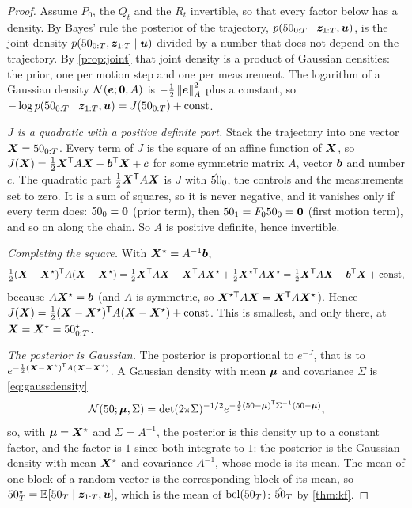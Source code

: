 \begin{proof}
Assume $P_0$, the $Q_t$ and the $R_t$ invertible, so that every factor
below has a density. By Bayes' rule the posterior of the trajectory,
$p(50_{0:T}\mid\bm{z}_{1:T},\bm{u})$, is the joint density
$p(50_{0:T},\bm{z}_{1:T}\mid\bm{u})$ divided by a number that does not depend on
the trajectory. By \cref{prop:joint} that joint density is a product of
Gaussian densities: the prior, one per motion step and one per
measurement. The logarithm of a Gaussian density
$\mathcal{N}(\bm{e};\bm{0},A)$ is $-\tfrac12\left\lVert \bm{e}\right\rVert_A^2$ plus a
constant, so $-\log p(50_{0:T}\mid\bm{z}_{1:T},\bm{u})=J(50_{0:T})
+\text{const}$.

\emph{$J$ is a quadratic with a positive definite part.} Stack the
trajectory into one vector $\bm{X}=50_{0:T}$. Every term of $J$ is the
square of an affine function of $\bm{X}$, so
$J(\bm{X})=\tfrac12\bm{X}^{\mathsf{T}} A\bm{X}-\bm{b}^{\mathsf{T}}\bm{X}+c$ for some
symmetric matrix $A$, vector $\bm{b}$ and number $c$. The quadratic part
$\tfrac12\bm{X}^{\mathsf{T}} A\bm{X}$ is $J$ with $\hat{50}_0$, the controls and the
measurements set to zero. It is a sum of squares, so it is never
negative, and it vanishes only if every term does: $50_0=\bm{0}$ (prior
term), then $50_1=F_050_0=\bm{0}$ (first motion term), and so on along the
chain. So $A$ is positive definite, hence invertible.

\emph{Completing the square.} With $\bm{X}^\star=A^{-1}\bm{b}$,
\[
  \tfrac12(\bm{X}-\bm{X}^\star)^{\mathsf{T}} A(\bm{X}-\bm{X}^\star)
  =\tfrac12\bm{X}^{\mathsf{T}} A\bm{X}-\bm{X}^{\mathsf{T}} A\bm{X}^\star
   +\tfrac12\bm{X}^{\star\mathsf T}A\bm{X}^\star
  =\tfrac12\bm{X}^{\mathsf{T}} A\bm{X}-\bm{b}^{\mathsf{T}}\bm{X}+\text{const},
\]
because $A\bm{X}^\star=\bm{b}$ (and $A$ is symmetric, so
$\bm{X}^{\star\mathsf T}A\bm{X}=\bm{X}^{\mathsf{T}} A\bm{X}^\star$). Hence
$J(\bm{X})=\tfrac12(\bm{X}-\bm{X}^\star)^{\mathsf{T}} A(\bm{X}-\bm{X}^\star)
+\text{const}$. This is smallest, and only there, at $\bm{X}=\bm{X}^\star=50^\star_{0:T}$.

\emph{The posterior is Gaussian.} The posterior is proportional to
$e^{-J}$, that is to
$e^{-\frac12(\bm{X}-\bm{X}^\star)^{\mathsf{T}} A(\bm{X}-\bm{X}^\star)}$. A
Gaussian density with mean $\bm{\mu}$ and covariance $\Sigma$ is
\eqref{eq:gaussdensity}
\[
  \mathcal{N}(50;\bm{\mu},\Sigma)=\det(2\pi\Sigma)^{-1/2}
  e^{-\frac12(50-\bm{\mu})^{\mathsf{T}}\Sigma^{-1}(50-\bm{\mu})},
\]
so, with $\bm{\mu}=\bm{X}^\star$ and $\Sigma=A^{-1}$, the posterior is this
density up to a constant factor, and the factor is $1$ since both
integrate to $1$: the posterior is the Gaussian density with mean
$\bm{X}^\star$ and covariance $A^{-1}$, whose mode is its mean. The mean of one block of
a random vector is the corresponding block of its mean, so
$50^\star_T=\mathbb{E}[50_T\mid\bm{z}_{1:T},\bm{u}]$, which is the mean of
$\operatorname{bel}(50_T)$: $\hat{50}_T$ by \cref{thm:kf}.
\end{proof}

